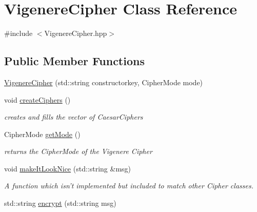 \hypertarget{class_vigenere_cipher}{\section{Vigenere\-Cipher Class Reference}
\label{class_vigenere_cipher}
}


{\ttfamily \#include $<$Vigenere\-Cipher.\-hpp$>$}

\subsection*{Public Member Functions}
\begin{DoxyCompactItemize}
\item 
\hyperlink{class_vigenere_cipher_add794fab3207409dcd5962319559b694}{Vigenere\-Cipher} (std\-::string constructorkey, Cipher\-Mode mode)
\item 
\hypertarget{class_vigenere_cipher_a0277fd4f60a7dd6384f4042de8cad34d}{void \hyperlink{class_vigenere_cipher_a0277fd4f60a7dd6384f4042de8cad34d}{create\-Ciphers} ()}\label{class_vigenere_cipher_a0277fd4f60a7dd6384f4042de8cad34d}

\begin{DoxyCompactList}\small\item\em creates and fills the vector of Caesar\-Ciphers \end{DoxyCompactList}\item 
\hypertarget{class_vigenere_cipher_a32b3cd7e3c27f1f77b2bbabd39d88687}{Cipher\-Mode \hyperlink{class_vigenere_cipher_a32b3cd7e3c27f1f77b2bbabd39d88687}{get\-Mode} ()}\label{class_vigenere_cipher_a32b3cd7e3c27f1f77b2bbabd39d88687}

\begin{DoxyCompactList}\small\item\em returns the Cipher\-Mode of the Vigenere Cipher \end{DoxyCompactList}\item 
\hypertarget{class_vigenere_cipher_a56da7859a8a8d2b2f9b05e59b9ab43f1}{void \hyperlink{class_vigenere_cipher_a56da7859a8a8d2b2f9b05e59b9ab43f1}{make\-It\-Look\-Nice} (std\-::string \&msg)}\label{class_vigenere_cipher_a56da7859a8a8d2b2f9b05e59b9ab43f1}

\begin{DoxyCompactList}\small\item\em A function which isn't implemented but included to match other Cipher classes. \end{DoxyCompactList}\item 
std\-::string \hyperlink{class_vigenere_cipher_a4bc1e285ea48d73bc100f1cf247ce5a4}{encrypt} (std\-::string msg)
\end{DoxyCompactItemize}
